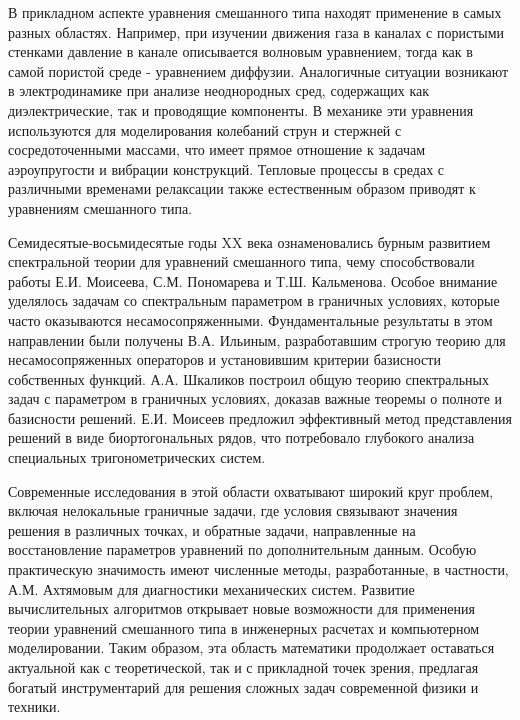 \documentclass[12pt, a4paper]{article}
\begin{document}
В прикладном аспекте уравнения смешанного типа находят применение в самых разных областях. Например, при изучении движения газа в каналах с пористыми стенками давление в канале описывается волновым уравнением, тогда как в самой пористой среде - уравнением диффузии. Аналогичные ситуации возникают в электродинамике при анализе неоднородных сред, содержащих как диэлектрические, так и проводящие компоненты. В механике эти уравнения используются для моделирования колебаний струн и стержней с сосредоточенными массами, что имеет прямое отношение к задачам аэроупругости и вибрации конструкций. Тепловые процессы в средах с различными временами релаксации также естественным образом приводят к уравнениям смешанного типа.

Семидесятые-восьмидесятые годы XX века ознаменовались бурным развитием спектральной теории для уравнений смешанного типа, чему способствовали работы Е.И. Моисеева, С.М. Пономарева и Т.Ш. Кальменова. Особое внимание уделялось задачам со спектральным параметром в граничных условиях, которые часто оказываются несамосопряженными. Фундаментальные результаты в этом направлении были получены В.А. Ильиным, разработавшим строгую теорию для несамосопряженных операторов и установившим критерии базисности собственных функций. А.А. Шкаликов построил общую теорию спектральных задач с параметром в граничных условиях, доказав важные теоремы о полноте и базисности решений. Е.И. Моисеев предложил эффективный метод представления решений в виде биортогональных рядов, что потребовало глубокого анализа специальных тригонометрических систем.

Современные исследования в этой области охватывают широкий круг проблем, включая нелокальные граничные задачи, где условия связывают значения решения в различных точках, и обратные задачи, направленные на восстановление параметров уравнений по дополнительным данным. Особую практическую значимость имеют численные методы, разработанные, в частности, А.М. Ахтямовым для диагностики механических систем. Развитие вычислительных алгоритмов открывает новые возможности для применения теории уравнений смешанного типа в инженерных расчетах и компьютерном моделировании. Таким образом, эта область математики продолжает оставаться актуальной как с теоретической, так и с прикладной точек зрения, предлагая богатый инструментарий для решения сложных задач современной физики и техники.
\end{document}
